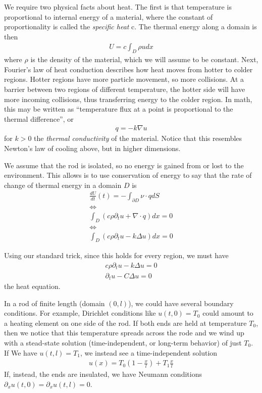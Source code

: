 \documentclass{article}
\newcommand{\pd}{\partial}
\begin{document}
	We require two physical facts about heat. The first is that temperature is proportional to internal energy of a material, where the constant of proportionality is called the \textit{specific heat} c. The thermal energy along a domain is then
	\begin{align*}
		U = c \int_{D} \rho u dx
	\end{align*}
	where $\rho$ is the density of the material, which we will assume to be constant. Next, Fourier's law of heat conduction describes how heat moves from hotter to colder regions. Hotter regions have more particle movement, so more collisions. At a barrier between two regions of different temperature, the hotter side will have more incoming collisions, thus transferring energy to the colder region. In math, this may be written as ``temperature flux at a point is proportional to the thermal difference'', or 
	\begin{align*}
		q = -k \nabla u
	\end{align*}
	for $k>0$ the \textit{thermal conductivity} of the material. Notice that this resembles Newton's law of cooling above, but in higher dimensions. 
	
	We assume that the rod is isolated, so no energy is gained from or lost to the environment. This allows is to use conservation of energy to say that the  rate of change of thermal energy in a domain $D$ is
	\begin{align*}
		\frac{d U}{dt}(t) = -\int_{\pd D} \nu \cdot q dS\\
		\Leftrightarrow \\
		\int_{D} \left(c\rho \pd_{t} u + \nabla\cdot q\right) dx=0 \\
			\Leftrightarrow \\
		\int_{D} \left(c\rho \pd_{t} u - k\Delta u\right) dx=0
	\end{align*}
	
	Using our standard trick, since this holds for every region, we must have 
	\begin{align*}
		c\rho \pd_{t} u - k\Delta u = 0 \\
		 \pd_{t} u - C\Delta u = 0
	\end{align*}
	the heat equation. 
	
	In a rod of finite length (domain $(0,l)$), we could have several boundary conditions. For example, Dirichlet conditions like $u(t,0) = T_0$ could amount to a heating element on one side of the rod. If both ends are held at temperature $T_0$, then we notice that this temperature spreads across the rode and we wind up with a stead-state solution (time-independent, or long-term behavior) of just $T_0$. If We have $u(t,l) = T_1$, we instead see a time-independent solution 
	\begin{align*}
		u(x) = T_0(1-\frac{x}{l}) + T_1 \frac{x}{l}
	\end{align*}
	If, instead, the ends are insulated, we have Neumann conditions $\pd_{x}u(t,0) = \pd_{x}u(t,l) = 0$. 
	
\end{document}

